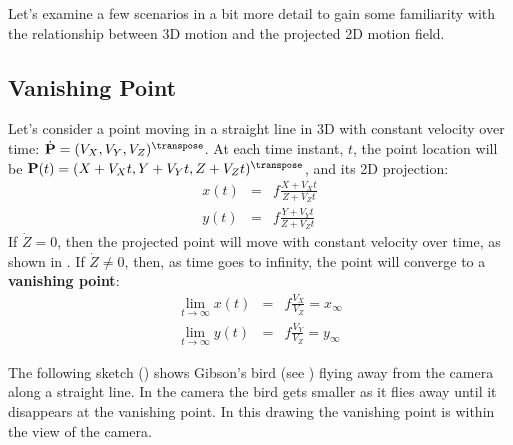 
Let's examine a few scenarios in a bit more detail to gain some familiarity with the relationship between 3D motion and the projected 2D motion field. 

\subsection{Vanishing Point}

Let's consider a point moving in a straight line in 3D with constant velocity over time: $\dot{\mathbf{P}} = (V_X, V_Y, V_Z)^\transpose$. At each time instant, $t$, the point location will be $\mathbf{P}(t) = (X+V_Xt, Y+V_Yt, Z+V_Zt)^\transpose$, and its 2D projection:
\begin{eqnarray}
x(t) & = & f \frac{X + V_X t}{Z + V_Z t}\\
y(t) & = & f \frac{Y + V_Y t}{Z + V_Z t} 
\end{eqnarray}
If $\dot{Z}=0$, then the projected point will move with constant velocity over time, as shown in \eqn{\ref{eq:parallelmotion}}. If $\dot{Z} \neq  0$, then, as time goes to infinity, the point will converge to a {\bf vanishing point}:
\begin{eqnarray}
\lim_{t \to \infty} x(t)  & = & f \frac{V_X}{V_Z} = x_{\infty}\\
\lim_{t \to \infty} y(t) & = & f \frac{V_Y}{V_Z} = y_{\infty}
\label{eq:motionvanishingpoint}
\end{eqnarray}


The following sketch (\fig{\ref{fig:flying_bird}}) shows Gibson's bird (see \fig{\ref{fig:gibson_bird}}) flying away from the camera along a straight line. In the camera the bird gets smaller as it flies away until it disappears at the vanishing point. In this drawing the vanishing point is within the view of the camera. 

